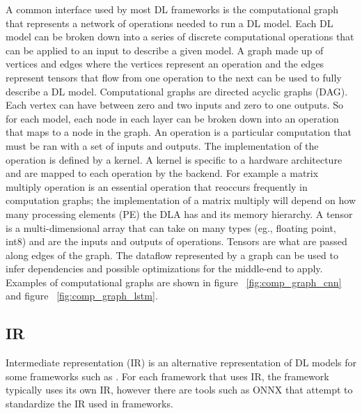 A common interface used by most DL frameworks is the computational graph
\cite{tensorflow} \cite{cntk} that represents a network of operations needed to
run a DL model. Each DL model can be broken down into a series of discrete
computational operations that can be applied to an input to describe a given
model. A graph made up of vertices and edges where the vertices represent an
operation and the edges represent tensors that flow from one operation to the
next can be used to fully describe a DL model. Computational graphs are
directed acyclic graphs (DAG).  Each vertex can have between zero and two
inputs and zero to one outputs. So for each model, each node in each layer can
be broken down into an operation that maps to a node in the graph. An operation
is a particular computation that must be ran with a set of inputs and outputs.
The implementation of the operation is defined by a kernel. A kernel is
specific to a hardware architecture and are mapped to each operation by the
backend. For example a matrix multiply operation is an essential operation
that reoccurs frequently in computation graphs; the implementation of a matrix
multiply will depend on how many processing elements (PE) the DLA has and its
memory hierarchy. A tensor is a multi-dimensional array that can take on many
types (eg., floating point, int8) and are the inputs and outputs of operations.
Tensors are what are passed along edges of the graph. The dataflow represented
by a graph can be used to infer dependencies and possible optimizations for the
middle-end to apply. Examples of computational graphs are shown in figure
~\ref{fig:comp_graph_cnn} and figure ~\ref{fig:comp_graph_lstm}.






\subsection{IR}
Intermediate representation (IR) is an alternative representation of DL models
for some frameworks such as \cite{DLVM} \cite{nGraph} \cite{ONNX}. For each
framework that uses IR, the framework typically uses its own IR, however
there are tools such as ONNX that attempt to standardize the IR used in
frameworks. 

